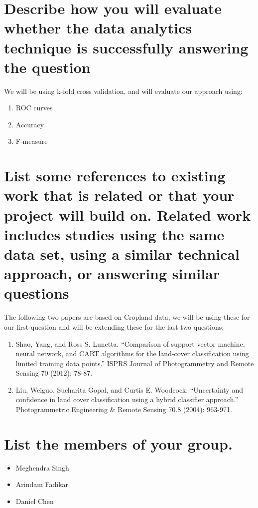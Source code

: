 \documentclass[10pt,letterpaper]{article}
\begin{document}
\section{Describe how you will evaluate whether the data analytics technique is successfully answering the question}

We will be using k-fold cross validation, and will evaluate our approach using:
\begin{enumerate}
	\item ROC curves
	\item Accuracy
	\item F-measure
\end{enumerate}

\section{List some references to existing work that is related or that your project will build on. Related work includes studies using the same data set, using a similar technical approach, or answering similar questions}

The following two papers are based on Cropland data, we will be using these for our first question and will be extending these for the last two questions:

\begin{enumerate}
	\item Shao, Yang, and Ross S. Lunetta. ``Comparison of support vector machine, neural network, and CART algorithms for the land-cover classification using limited training data points.'' ISPRS Journal of Photogrammetry and Remote Sensing 70 (2012): 78-87.
	\item Liu, Weiguo, Sucharita Gopal, and Curtis E. Woodcock. ``Uncertainty and confidence in land cover classification using a hybrid classifier approach.'' Photogrammetric Engineering \& Remote Sensing 70.8 (2004): 963-971.
\end{enumerate}


\section{List the members of your group.}

\begin{itemize}
	\item Meghendra Singh
	\item Arindam Fadikar
	\item Daniel Chen
\end{itemize}
\end{document}
